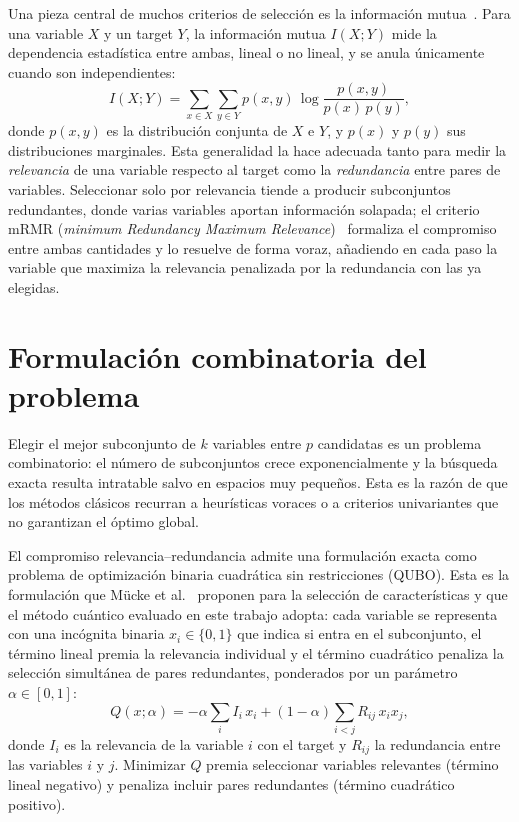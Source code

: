 Una pieza central de muchos criterios de selección es la información
mutua~\cite{cover2006}. Para una variable $X$ y un target $Y$, la
información mutua $I(X;Y)$ mide la dependencia estadística entre
ambas, lineal o no lineal, y se anula únicamente cuando son
independientes:
\begin{equation}
  \label{eq:mi}
  I(X;Y) = \sum_{x \in X} \sum_{y \in Y} p(x,y)\,
  \log\frac{p(x,y)}{p(x)\,p(y)},
\end{equation}
donde $p(x,y)$ es la distribución conjunta de $X$ e $Y$, y $p(x)$ y
$p(y)$ sus distribuciones marginales. Esta generalidad la hace adecuada
tanto para medir la
\emph{relevancia} de una variable respecto al target como la
\emph{redundancia} entre pares de variables. Seleccionar solo por
relevancia tiende a producir subconjuntos redundantes, donde varias
variables aportan información solapada; el criterio mRMR
(\textit{minimum Redundancy Maximum Relevance})~\cite{peng2005}
formaliza el compromiso entre ambas cantidades y lo resuelve de forma
voraz, añadiendo en cada paso la variable que maximiza la relevancia
penalizada por la redundancia con las ya elegidas.

\section{Formulación combinatoria del problema}
\label{sec:mt-qubo}

Elegir el mejor subconjunto de $k$ variables entre $p$ candidatas es
un problema combinatorio: el número de subconjuntos crece
exponencialmente y la búsqueda exacta resulta intratable salvo en
espacios muy pequeños. Esta es la razón de que los métodos clásicos
recurran a heurísticas voraces o a criterios univariantes que no
garantizan el óptimo global.

El compromiso relevancia--redundancia admite una formulación exacta
como problema de optimización binaria cuadrática sin restricciones
(QUBO). Esta es la formulación que Mücke et al.~\cite{mucke2023}
proponen para la selección de características y que el método cuántico
evaluado en este trabajo adopta: cada variable se representa con una
incógnita binaria $x_i \in \{0,1\}$ que indica si entra en el
subconjunto, el término lineal premia la relevancia individual y el
término cuadrático penaliza la selección simultánea de pares
redundantes, ponderados por un parámetro $\alpha \in [0,1]$:
\begin{equation}
  \label{eq:qubo}
  Q(x;\alpha) = -\alpha \sum_{i} I_i\, x_i
  + (1-\alpha) \sum_{i<j} R_{ij}\, x_i x_j,
\end{equation}
donde $I_i$ es la relevancia de la variable $i$ con el target y $R_{ij}$
la redundancia entre las variables $i$ y $j$. Minimizar $Q$ premia
seleccionar variables relevantes (término lineal negativo) y penaliza
incluir pares redundantes (término cuadrático positivo).

